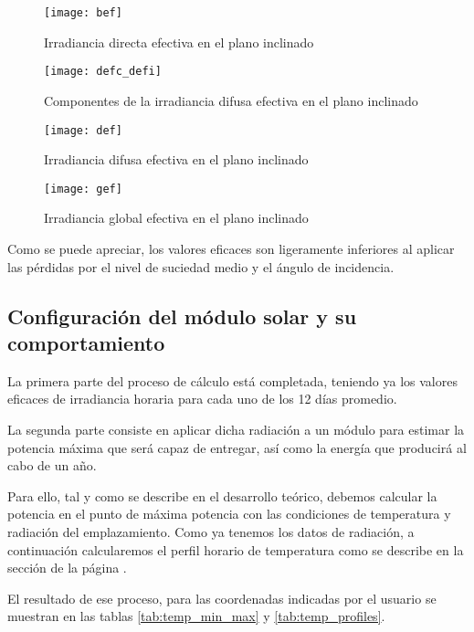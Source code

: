 \begin{figure}[H]
\texttt{[image: bef]}
\centering
\caption{Irradiancia directa efectiva en el plano inclinado}
\label{fig:hourly_bef}
\end{figure}

\begin{figure}[H]
\texttt{[image: defc\_defi]}
\centering
\caption{Componentes de la irradiancia difusa efectiva en el plano inclinado}
\label{fig:hourly_bef}
\end{figure}

\begin{figure}[H]
\texttt{[image: def]}
\centering
\caption{Irradiancia difusa efectiva en el plano inclinado}
\label{fig:hourly_bef}
\end{figure}

\begin{figure}[H]
\texttt{[image: gef]}
\centering
\caption{Irradiancia global efectiva en el plano inclinado}
\label{fig:hourly_bef}
\end{figure}

Como se puede apreciar, los valores eficaces son ligeramente inferiores al aplicar las pérdidas por el nivel de suciedad medio y el ángulo de incidencia.

\subsection{Configuración del módulo solar y su comportamiento}

La primera parte del proceso de cálculo está completada, teniendo ya los valores eficaces de irradiancia horaria para cada uno de los 12 días promedio.

La segunda parte consiste en aplicar dicha radiación a un módulo para estimar la potencia máxima que será capaz de entregar, así como la energía que producirá al cabo de un año.

Para ello, tal y como se describe en el desarrollo teórico, debemos calcular la potencia en el punto de máxima potencia con las condiciones de temperatura y radiación del emplazamiento. Como ya tenemos los datos de radiación, a continuación calcularemos el perfil horario de temperatura como se describe en la sección de la página \pageref{section:term_behaviour}.

El resultado de ese proceso, para las coordenadas indicadas por el usuario se muestran en las tablas \ref{tab:temp_min_max} y \ref{tab:temp_profiles}.

